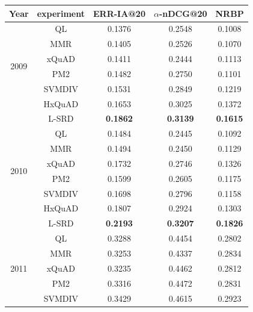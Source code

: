 \documentclass[review]{elsarticle}
\begin{document}
\begin{table}[!htb]
\centering
\begin{tabular}{|c|c|c|c|c|}
\hline
Year & experiment & ERR-IA@20 & $\alpha$-nDCG@20 & NRBP \\%
\hline
\multirow{6}{*}{2009}          & QL     & 0.1376          & 0.2548          & 0.1008          \\
					           & MMR    & 0.1405          & 0.2526          & 0.1070          \\
	                           & xQuAD  & 0.1411          & 0.2444          & 0.1113          \\
	                           & PM2    & 0.1482          & 0.2750          & 0.1101          \\
							   & SVMDIV & 0.1531          & 0.2849          & 0.1219          \\
							   & HxQuAD & 0.1653   & 0.3025 &   0.1372      \\
                               & L-SRD  & \textbf{0.1862} & \textbf{0.3139} & \textbf{0.1615} \\
\hline
\multirow{6}{*}{2010}          & QL     & 0.1484          & 0.2445          & 0.1092          \\
	                           & MMR    & 0.1494          & 0.2450          & 0.1129          \\
	                           & xQuAD  & 0.1732          & 0.2746          & 0.1326          \\
                               & PM2    & 0.1599          & 0.2605          & 0.1175          \\
							   & SVMDIV & 0.1698          & 0.2796          & 0.1158          \\
							   & HxQuAD & 0.1807  & 0.2924 &  0.1303 \\
                               & L-SRD  & \textbf{0.2193} & \textbf{0.3207} & \textbf{0.1826} \\
\hline
\multirow{6}{*}{2011}          & QL     & 0.3288          & 0.4454          & 0.2802          \\
	                           & MMR    & 0.3253          & 0.4337          & 0.2834          \\
	                           & xQuAD  & 0.3235          & 0.4462          & 0.2812          \\
                               & PM2    & 0.3316          & 0.4472          & 0.2831          \\
							   & SVMDIV & 0.3429          & 0.4615          & 0.2923          \\
							   

\end{tabular}
\end{table}
\end{document}
